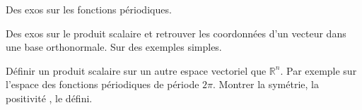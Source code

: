 Des exos sur les fonctions périodiques. 


Des exos sur le produit scalaire et retrouver les coordonnées d'un vecteur dans une base orthonormale. 
Sur des exemples simples. 

Définir un produit scalaire sur un autre espace vectoriel que $\mathbb{R}^n$. 
Par exemple sur l'espace des fonctions périodiques de période $2\pi$. Montrer la symétrie, la positivité , le défini. 